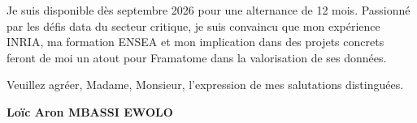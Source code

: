 \documentclass[a4paper,11pt]{article}
\begin{document}
\vspace{0.8em}
Je suis disponible dès septembre 2026 pour une alternance de 12 mois. Passionné par les défis data du secteur critique, je suis convaincu que mon expérience INRIA, ma formation ENSEA et mon implication dans des projets concrets feront de moi un atout pour Framatome dans la valorisation de ses données.

\vspace{1.5em}
\noindent Veuillez agréer, Madame, Monsieur, l'expression de mes salutations distinguées.

\vspace{2em}
\noindent \textbf{Loïc Aron MBASSI EWOLO}
\end{document}
